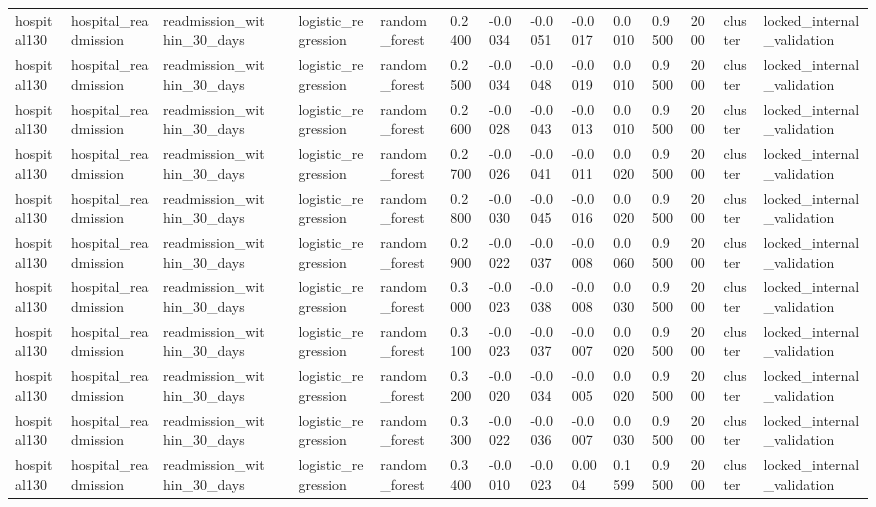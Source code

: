 \begin{tabular}{lllllllllllllll}
hospital130 & hospital\_readmission & readmission\_within\_30\_days &  & logistic\_regression & random\_forest & 0.2400 & -0.0034 & -0.0051 & -0.0017 & 0.0010 & 0.9500 & 2000 & cluster & locked\_internal\_validation \\
hospital130 & hospital\_readmission & readmission\_within\_30\_days &  & logistic\_regression & random\_forest & 0.2500 & -0.0034 & -0.0048 & -0.0019 & 0.0010 & 0.9500 & 2000 & cluster & locked\_internal\_validation \\
hospital130 & hospital\_readmission & readmission\_within\_30\_days &  & logistic\_regression & random\_forest & 0.2600 & -0.0028 & -0.0043 & -0.0013 & 0.0010 & 0.9500 & 2000 & cluster & locked\_internal\_validation \\
hospital130 & hospital\_readmission & readmission\_within\_30\_days &  & logistic\_regression & random\_forest & 0.2700 & -0.0026 & -0.0041 & -0.0011 & 0.0020 & 0.9500 & 2000 & cluster & locked\_internal\_validation \\
hospital130 & hospital\_readmission & readmission\_within\_30\_days &  & logistic\_regression & random\_forest & 0.2800 & -0.0030 & -0.0045 & -0.0016 & 0.0020 & 0.9500 & 2000 & cluster & locked\_internal\_validation \\
hospital130 & hospital\_readmission & readmission\_within\_30\_days &  & logistic\_regression & random\_forest & 0.2900 & -0.0022 & -0.0037 & -0.0008 & 0.0060 & 0.9500 & 2000 & cluster & locked\_internal\_validation \\
hospital130 & hospital\_readmission & readmission\_within\_30\_days &  & logistic\_regression & random\_forest & 0.3000 & -0.0023 & -0.0038 & -0.0008 & 0.0030 & 0.9500 & 2000 & cluster & locked\_internal\_validation \\
hospital130 & hospital\_readmission & readmission\_within\_30\_days &  & logistic\_regression & random\_forest & 0.3100 & -0.0023 & -0.0037 & -0.0007 & 0.0020 & 0.9500 & 2000 & cluster & locked\_internal\_validation \\
hospital130 & hospital\_readmission & readmission\_within\_30\_days &  & logistic\_regression & random\_forest & 0.3200 & -0.0020 & -0.0034 & -0.0005 & 0.0020 & 0.9500 & 2000 & cluster & locked\_internal\_validation \\
hospital130 & hospital\_readmission & readmission\_within\_30\_days &  & logistic\_regression & random\_forest & 0.3300 & -0.0022 & -0.0036 & -0.0007 & 0.0030 & 0.9500 & 2000 & cluster & locked\_internal\_validation \\
hospital130 & hospital\_readmission & readmission\_within\_30\_days &  & logistic\_regression & random\_forest & 0.3400 & -0.0010 & -0.0023 & 0.0004 & 0.1599 & 0.9500 & 2000 & cluster & locked\_internal\_validation \\

\end{tabular}
